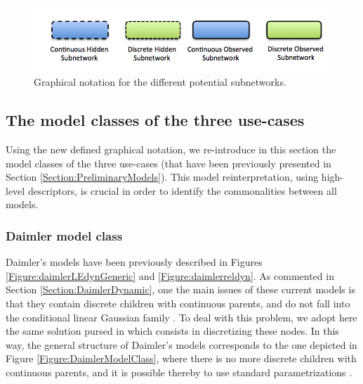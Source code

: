 \begin{figure}[ht!]
\begin{center}
\includegraphics[scale=0.4]{./figures/ModelClass0}
\caption{\label{Figure:ModelClass:Notation} Graphical notation for the different potential subnetworks.}
\end{center}
\end{figure}

\subsection{The model classes of the three use-cases}

Using the new defined graphical notation, we re-introduce in this section the model classes of the three use-cases (that have been previously presented in Section \ref{Section:PreliminaryModels}). This model reinterpretation, using high-level descriptors, is crucial in order to identify the commonalities between all models. 

\subsubsection{Daimler model class}

Daimler's models have been previously described in Figures \ref{Figure:daimlerLEdynGeneric} and \ref{Figure:daimlerreldyn}. As commented in Section \ref{Section:DaimlerDynamic}, one the main issues of these current models is that they contain discrete children with continuous parents, and do not fall into the conditional linear Gaussian family \cite{JensenNielsen2007}. To deal with this problem, we adopt here the same solution pursed in \cite{kasper2012object} which consists in discretizing these nodes. In this way, the general structure of Daimler's models corresponds to the one depicted in Figure \ref{Figure:DaimlerModelClass}, where there is no more discrete children with continuous parents, and it is possible thereby to use standard parametrizations \cite{JensenNielsen2007}. 

